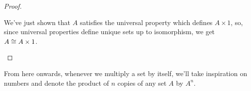 \begin{proof}
\begin{enumerate}[(a)]
		We've just shown that $A$ satisfies the universal property which defines $A\times 1$, so, since universal properties define unique sets up to isomorphism, we get $A\cong A\times 1$.
	\end{enumerate}
\end{proof}

\begin{rmk}
	From here onwards, whenever we multiply a set by itself, we'll take inspiration on numbers and denote the product of $n$ copies of any set $A$ by $A^n$.
\end{rmk}
